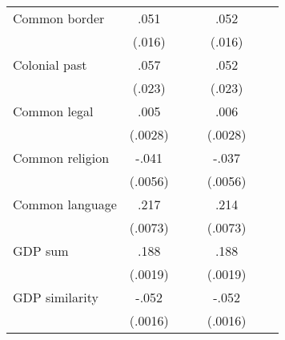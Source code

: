 \begin{table}
\begin{threeparttable}
\begin{tabular}{l*{6}{c}}
Common border       &        .051\sym{**}&                    &                    &        .052\sym{**}&                    &                    \\
                    &      (.016)        &                    &                    &      (.016)        &                    &                    \\
Colonial past       &        .057\sym{*} &                    &                    &        .052\sym{*} &                    &                    \\
                    &      (.023)        &                    &                    &      (.023)        &                    &                    \\
Common legal        &        .005\sym{+} &                    &                    &        .006\sym{*} &                    &                    \\
                    &     (.0028)        &                    &                    &     (.0028)        &                    &                    \\
Common religion     &       -.041\sym{**}&                    &                    &       -.037\sym{**}&                    &                    \\
                    &     (.0056)        &                    &                    &     (.0056)        &                    &                    \\
Common language     &        .217\sym{**}&                    &                    &        .214\sym{**}&                    &                    \\
                    &     (.0073)        &                    &                    &     (.0073)        &                    &                    \\
GDP sum             &        .188\sym{**}&                    &                    &        .188\sym{**}&                    &                    \\
                    &     (.0019)        &                    &                    &     (.0019)        &                    &                    \\
GDP similarity      &       -.052\sym{**}&                    &                    &       -.052\sym{**}&                    &                    \\
                    &     (.0016)        &                    &                    &     (.0016)        &                    &                    \\

\end{tabular}
\end{threeparttable}
\end{table}
